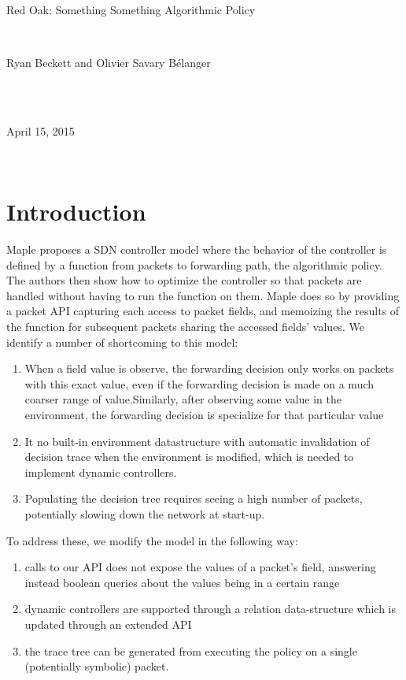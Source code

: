 \documentclass[11pt]{article}
\begin{document}
\quad \\
\quad \\
\quad \\
\centerline{ \large{Red Oak: Something Something Algorithmic Policy}}
\vspace{1pt}\\
\centerline{Ryan Beckett and Olivier Savary B\'{e}langer} \\
\\
\centerline{April 15, 2015} \\


\section*{Introduction}

Maple \cite{Maple} proposes a SDN controller model where the behavior of the controller is defined by a function from packets to forwarding path, the algorithmic policy. The authors then show how to optimize the controller so that packets are handled without having to run the function on them. Maple does so by providing a packet API capturing each access to packet fields, and memoizing the results of the function for subsequent packets sharing the accessed fields' values. We identify a number of shortcoming to this model:
\begin{enumerate}
\item When a field value is observe, the forwarding decision only works on packets with this exact value, even if the forwarding decision is made on a much coarser range of value.Similarly, after observing some value in the environment, the forwarding decision is specialize for that particular value
  
\item It no built-in environment datastructure with automatic invalidation of decision trace when the environment is modified, which is needed to implement dynamic controllers.
  
  \item Populating the decision tree requires seeing a high number of packets, potentially slowing down the network at start-up. 
\end{enumerate}


To address these, we modify the model in the following way:
\begin{enumerate}
  \item calls to our API does not expose the values of a packet's field, answering instead boolean queries about the values being in a certain range
  \item dynamic controllers are supported through a relation data-structure which is updated through an extended API
  \item the trace tree can be generated from executing the policy on a single (potentially symbolic) packet.
\end{enumerate}
\end{document}
